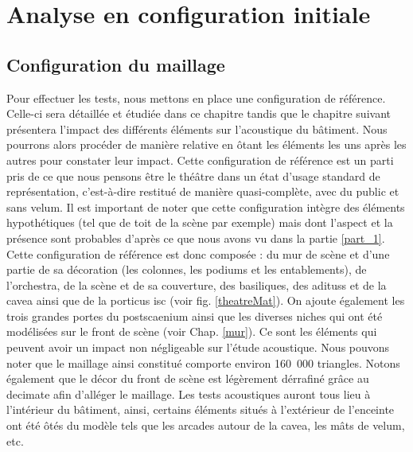 	
\chapter{Analyse en configuration initiale}
	\minitoc
	\newpage
	

	\section{Configuration du maillage} \label{sect_config_init}
Pour effectuer les tests, nous mettons en place une configuration de référence. Celle-ci sera détaillée et étudiée dans ce chapitre tandis que le chapitre suivant présentera l'impact des différents éléments sur l'acoustique du bâtiment. Nous pourrons alors procéder de manière relative en ôtant les éléments les uns après les autres pour constater leur impact. Cette configuration de référence est un parti pris de ce que nous pensons être le théâtre dans un état d'usage standard de représentation, c'est-à-dire restitué de manière quasi-complète, avec du public et sans \gls{velum}. Il est important de noter que cette configuration intègre des éléments hypothétiques (tel que de toit de la scène par exemple) mais dont l'aspect et la présence sont probables d'après ce que nous avons vu dans la partie \ref{part_1}. Cette configuration de référence est donc composée : du mur de scène et d'une partie de sa décoration (les colonnes, les \glspl{podium} et les entablements), de l'\gls{orchestra}, de la scène et de sa couverture, des basiliques, des \glspl{aditus} et de la \gls{cavea} ainsi que de la \gls{porticus isc} (voir fig. \ref{theatreMat}). On ajoute également les trois grandes portes du \gls{postscaenium} ainsi que les diverses niches qui ont été modélisées sur le front de scène (voir Chap. \ref{mur}). Ce sont les éléments qui peuvent avoir un impact non négligeable sur l'étude acoustique. Nous pouvons noter que le maillage ainsi constitué comporte environ 160~000 triangles. Notons également que le décor du front de scène est légèrement dérrafiné grâce au \gls{decimate} afin d'alléger le maillage. Les tests acoustiques auront tous lieu à l'intérieur du bâtiment, ainsi, certains éléments situés à l'extérieur de l'enceinte ont été ôtés du modèle tels que les arcades autour de la \gls{cavea}, les mâts de \gls{velum}, etc. 

